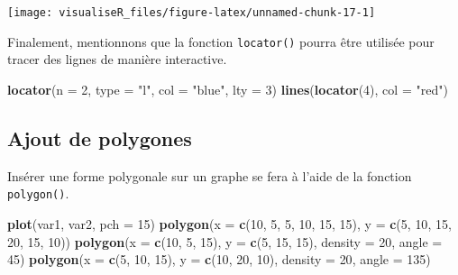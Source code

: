 \documentclass[]{article}
\newenvironment{Shaded}{\begin{snugshade}}{\end{snugshade}}
\newcommand{\DataTypeTok}[1]{\textcolor[rgb]{0.13,0.29,0.53}{#1}}
\newcommand{\DecValTok}[1]{\textcolor[rgb]{0.00,0.00,0.81}{#1}}
\newcommand{\KeywordTok}[1]{\textcolor[rgb]{0.13,0.29,0.53}{\textbf{#1}}}
\newcommand{\NormalTok}[1]{#1}
\newcommand{\StringTok}[1]{\textcolor[rgb]{0.31,0.60,0.02}{#1}}
\begin{document}
\begin{center}\texttt{[image: visualiseR\_files/figure-latex/unnamed-chunk-17-1]} \end{center}

Finalement, mentionnons que la fonction \texttt{locator()} pourra être utilisée pour tracer des lignes de manière interactive.

\begin{Shaded}
\begin{Highlighting}[]
\KeywordTok{locator}\NormalTok{(}\DataTypeTok{n =} \DecValTok{2}\NormalTok{, }\DataTypeTok{type =} \StringTok{"l"}\NormalTok{, }\DataTypeTok{col =} \StringTok{"blue"}\NormalTok{, }\DataTypeTok{lty =} \DecValTok{3}\NormalTok{)}
\KeywordTok{lines}\NormalTok{(}\KeywordTok{locator}\NormalTok{(}\DecValTok{4}\NormalTok{), }\DataTypeTok{col =} \StringTok{"red"}\NormalTok{)}
\end{Highlighting}
\end{Shaded}

\hypertarget{ajout-de-polygones}{%
\subsection{Ajout de polygones}\label{ajout-de-polygones}}

Insérer une forme polygonale sur un graphe se fera à l'aide de la fonction \texttt{polygon()}.

\begin{Shaded}
\begin{Highlighting}[]
\KeywordTok{plot}\NormalTok{(var1, var2, }\DataTypeTok{pch =} \DecValTok{15}\NormalTok{)}
\KeywordTok{polygon}\NormalTok{(}\DataTypeTok{x =} \KeywordTok{c}\NormalTok{(}\DecValTok{10}\NormalTok{, }\DecValTok{5}\NormalTok{, }\DecValTok{5}\NormalTok{, }\DecValTok{10}\NormalTok{, }\DecValTok{15}\NormalTok{, }\DecValTok{15}\NormalTok{), }\DataTypeTok{y =} \KeywordTok{c}\NormalTok{(}\DecValTok{5}\NormalTok{, }\DecValTok{10}\NormalTok{, }\DecValTok{15}\NormalTok{, }\DecValTok{20}\NormalTok{, }\DecValTok{15}\NormalTok{, }\DecValTok{10}\NormalTok{))}
\KeywordTok{polygon}\NormalTok{(}\DataTypeTok{x =} \KeywordTok{c}\NormalTok{(}\DecValTok{10}\NormalTok{, }\DecValTok{5}\NormalTok{, }\DecValTok{15}\NormalTok{), }\DataTypeTok{y =} \KeywordTok{c}\NormalTok{(}\DecValTok{5}\NormalTok{, }\DecValTok{15}\NormalTok{, }\DecValTok{15}\NormalTok{), }\DataTypeTok{density =} \DecValTok{20}\NormalTok{, }\DataTypeTok{angle =} \DecValTok{45}\NormalTok{)}
\KeywordTok{polygon}\NormalTok{(}\DataTypeTok{x =} \KeywordTok{c}\NormalTok{(}\DecValTok{5}\NormalTok{, }\DecValTok{10}\NormalTok{, }\DecValTok{15}\NormalTok{), }\DataTypeTok{y =} \KeywordTok{c}\NormalTok{(}\DecValTok{10}\NormalTok{, }\DecValTok{20}\NormalTok{, }\DecValTok{10}\NormalTok{), }\DataTypeTok{density =} \DecValTok{20}\NormalTok{, }\DataTypeTok{angle =} \DecValTok{135}\NormalTok{)}
\end{Highlighting}
\end{Shaded}
\end{document}
